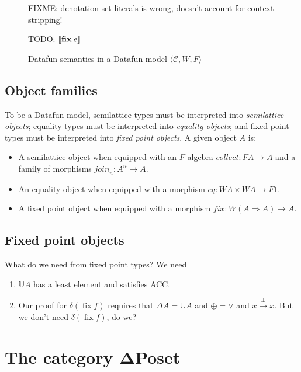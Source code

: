 \documentclass{rntz}\usepackage[a5]{rntzgeometry}\usepackage[fullwidth=130mm,width=330pt,]{narrow}
\newcommand\todo[1]{{\color{ACMRed}#1}}
\newcommand\cat\textbf
\newcommand\CP{\cat{\texorpdfstring{$\boldsymbol\Delta$Poset}{DeltaPoset}}}
\newcommand\termO{1}
\newcommand\D\Delta
\newcommand\x\times
\newcommand\tuple[1]{\langle{#1}\rangle}
\newcommand\<{\mskip 4mu plus 4mu minus 1mu}
\newcommand\valfn{\ensuremath{\mathbb{U}}}
\newcommand\vals{\valfn}
\newcommand\chgs[1]{\D{#1}}
\newcommand\upd{\mathbin{\oplus}}
\newcommand\updfn{\ensuremath{{\upd}}}
\newcommand\kwname\textbf
\newcommand\efix{\kwname{fix}\<}
\newcommand\den[1]{\ensuremath{\left\llbracket{#1}\right\rrbracket}}
\newcommand\homto\Rightarrow
\newcommand\catC{\ensuremath{\mathcal{C}}}
\newcommand\down{\ensuremath{F}}
\newcommand\disco{\ensuremath{W}}
\newcommand\downof[1]{\down #1}
\newcommand\discof[1]{\ensuremath{\disco #1}}
\newcommand\morph\mathit
\newcommand\validarrow\to
\newcommand\valid[1]{\mathrel{\overset{#1}{\validarrow}}}
\begin{document}
\begin{figure*}[p]
  \todo{FIXME: denotation set literals is wrong, doesn't account for context stripping!}

  \todo{TODO: $\den{\efix e}$}

  \caption{Datafun semantics in a Datafun model $\tuple{\catC, \disco, \down}$}
  \label{fig:general-semantics}
\end{figure*}


\subsection{Object families}
\label{sec:object-families}

To be a Datafun model, semilattice types must be interpreted into
\emph{semilattice objects}; equality types must be interpreted into
\emph{equality objects}; and fixed point types must be interpreted into
\emph{fixed point objects}. A given object $A$ is:


\begin{itemize}
\item A semilattice object when equipped with an \down-algebra $\morph{collect} :
  \downof{A} \to A$ and a family of morphisms $\morph{join}_n : A^n \to A$.

\item An equality object when equipped with a morphism $\morph{eq} : \discof A \x
\discof A \to \downof \termO$.

\item A fixed point object when equipped with a morphism $\morph{fix} : \discof{(A
  \homto A)} \to A$.
\end{itemize}


\subsection{Fixed point objects}
\label{sec:fixed-point-objects}

\todo{What do we need from fixed point types? We need
  \begin{enumerate}
  \item $\vals A$ has a least element and satisfies ACC.
  \item Our proof for $\delta(\mathop{\text{fix}} f)$ requires that $\chgs A =
    \vals A$ and $\updfn = {\vee}$ and $x \valid{\bot} x$. But we don't need
    $\delta(\mathop{\text{fix}} f)$, do we?
  \end{enumerate}
}


\section{The category \CP}
\label{sec:changeposets}
\end{document}
